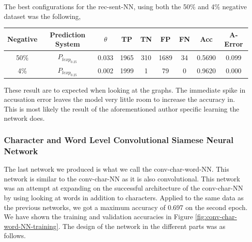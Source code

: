 The best configurations for the \gls{rec-sent-NN}, using both the 50\% and 4\%
negative dataset was the following,

\begin{center}
    \begin{adjustbox}{center}
    \begin{tabular}{|c|c|c|c|c|c|c|c|c|}
        \hline
        Negative  & Prediction System & $\theta$ & TP   & TN  & FP   & FN  &
        Acc       & A-Error
        \\ \hline
        50\%      & $P_{lexp_{0.25}}$ & 0.033    & 1965 & 310 & 1689 & 34  &
        0.5690    & 0.099
        \\ \hline
        4\%       & $P_{lexp_{0.25}}$ & 0.002    & 1999 & 1   & 79   & 0   &
        0.9620    & 0.000
        \\ \hline
    \hline
    \end{tabular}
    \end{adjustbox}
\end{center}

These result are to expected when looking at the graphs. The immediate spike in
accusation error leaves the model very little room to increase the accuracy in.
This is most likely the result of the aforementioned author specific learning
the network does.


\subsubsection{Character and Word Level Convolutional Siamese Neural Network}
\label{subsubsec:conv_char_word_nn}

The last network we produced is what we call the \gls{conv-char-word-NN}. This
network is similar to the \gls{conv-char-NN} as it is also convolutional. This
network was an attempt at expanding on the successful architecture of the
\gls{conv-char-NN} by using looking at words in addition to characters. Applied
to the same data as the previous networks, we got a maximum accuracy of 0.697 on
the second epoch. We have shown the training and validation accuracies in Figure
\ref{fig:conv-char-word-NN-training}. The design of the network in the different
parts was as follows.

